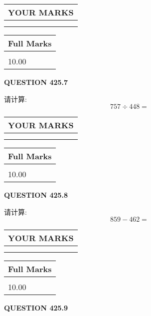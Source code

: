 \documentclass{ctexart}
\begin{document}
 

 
  
\vspace{0.2in}
  
\noindent\begin{tabular}{|l|}
\hline
 YOUR MARKS  \\
\hline
 \\ 
 \\ 
\hline
\end{tabular}
\hspace{0.05in} \begin{tabular}{|l|}
\hline
 Full Marks  \\
\hline
 \\ 
10.00 \\
\hline
\end{tabular}
{\textbf{\Large{QUESTION
425.7 
}}}
  
  
 
请计算:
\begin{equation}
757  \div    %
448 = \nonumber
\end{equation}
 

 

 
  
\vspace{0.2in}
  
\noindent\begin{tabular}{|l|}
\hline
 YOUR MARKS  \\
\hline
 \\ 
 \\ 
\hline
\end{tabular}
\hspace{0.05in} \begin{tabular}{|l|}
\hline
 Full Marks  \\
\hline
 \\ 
10.00 \\
\hline
\end{tabular}
{\textbf{\Large{QUESTION
425.8 
}}}
  
  
 
请计算:
\begin{equation}
859 -   %
462 = \nonumber
\end{equation}
 

 

 
  
\vspace{0.2in}
  
\noindent\begin{tabular}{|l|}
\hline
 YOUR MARKS  \\
\hline
 \\ 
 \\ 
\hline
\end{tabular}
\hspace{0.05in} \begin{tabular}{|l|}
\hline
 Full Marks  \\
\hline
 \\ 
10.00 \\
\hline
\end{tabular}
{\textbf{\Large{QUESTION
425.9 
}}}
  
\end{document}
